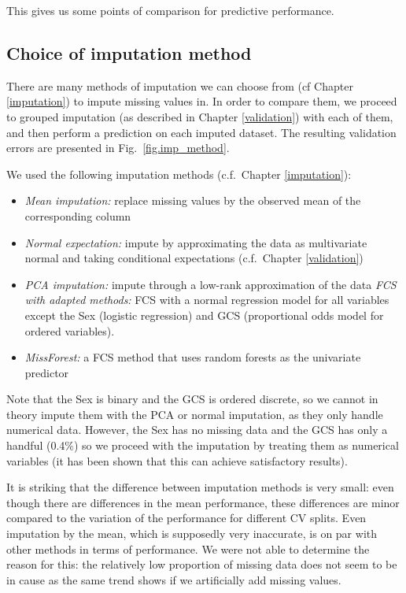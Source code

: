 This gives us some points of comparison for predictive performance.

		\subsection{Choice of imputation method}
		\label{choice.imp}
There are many methods of imputation we can choose from (cf Chapter \ref{imputation}) to impute missing values in. In order to compare them, we proceed to grouped imputation (as described in Chapter \ref{validation}) with each of them, and then perform a prediction on each imputed dataset. The resulting validation errors are presented in Fig.\ \ref{fig.imp_method}.

We used the following imputation methods (c.f.\ Chapter \ref{imputation}):
\begin{itemize}
\item \emph{Mean imputation:} replace missing values by the observed mean of the corresponding column
\item \emph{Normal expectation:} impute by approximating the data as multivariate normal and taking conditional expectations (c.f.\ Chapter \ref{validation})
\item \emph{PCA imputation:} impute through a low-rank approximation of the data
\emph{FCS with adapted methods:} FCS with a normal regression model for all variables except the Sex (logistic regression) and GCS (proportional odds model for ordered variables).
\item \emph{MissForest:} a FCS method that uses random forests \cite{svetnik2003RF} as the univariate predictor
\end{itemize}

Note that the Sex is binary and the GCS is ordered discrete, so we cannot in theory impute them with the PCA or normal imputation, as they only handle numerical data. However, the Sex has no missing data and the GCS has only a handful (0.4\%) so we proceed with the imputation by treating them as numerical variables (it has been shown \cite{bernaards2007robustness} that this can achieve satisfactory results).



It is striking that the difference between imputation methods is very small: even though there are differences in the mean performance, these differences are minor compared to the variation of the performance for different CV splits. Even imputation by the mean, which is supposedly very inaccurate, is on par with other methods in terms of performance. We were not able to determine the reason for this: the relatively low proportion of missing data does not seem to be in cause as the same trend shows if we artificially add missing values.

